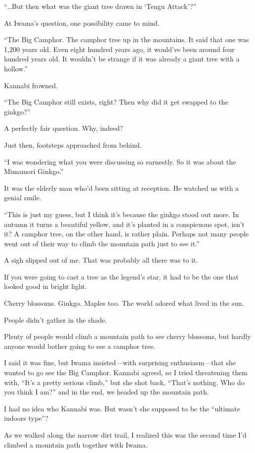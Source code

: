 \documentclass[
    a4paper,
    12pt,
    twoside,
    openany,
    UTF8,
    fontset=windows
]{ctexbook}
\begin{document}
``\dots But then what was the giant tree drawn in `Tengu Attack'?''

At Iwama's question, one possibility came to mind.

``The Big Camphor. The camphor tree up in the mountains. It said that one was 1,200 years old. Even eight hundred years ago, it would've been around four hundred years old. It wouldn't be strange if it was already a giant tree with a hollow.''

Kannabi frowned.

``The Big Camphor still exists, right? Then why did it get swapped to the ginkgo?''

A perfectly fair question. Why, indeed?

Just then, footsteps approached from behind.

``I was wondering what you were discussing so earnestly. So it was about the Mimamori Ginkgo.''

It was the elderly man who'd been sitting at reception. He watched us with a genial smile.

``This is just my guess, but I think it's because the ginkgo stood out more. In autumn it turns a beautiful yellow, and it's planted in a conspicuous spot, isn't it? A camphor tree, on the other hand, is rather plain. Perhaps not many people went out of their way to climb the mountain path just to see it.''

A sigh slipped out of me. That was probably all there was to it.

If you were going to cast a tree as the legend's star, it had to be the one that looked good in bright light.

Cherry blossoms. Ginkgo. Maples too. The world adored what lived in the sun.

People didn't gather in the shade.

Plenty of people would climb a mountain path to see cherry blossoms, but hardly anyone would bother going to see a camphor tree.

I said it was fine, but Iwama insisted---with surprising enthusiasm---that she wanted to go see the Big Camphor. Kannabi agreed, so I tried threatening them with, ``It's a pretty serious climb,'' but she shot back, ``That's nothing. Who do you think I am?'' and in the end, we headed up the mountain path.

I had no idea who Kannabi was. But wasn't she supposed to be the ``ultimate indoors type''?

As we walked along the narrow dirt trail, I realized this was the second time I'd climbed a mountain path together with Iwama.
\end{document}
